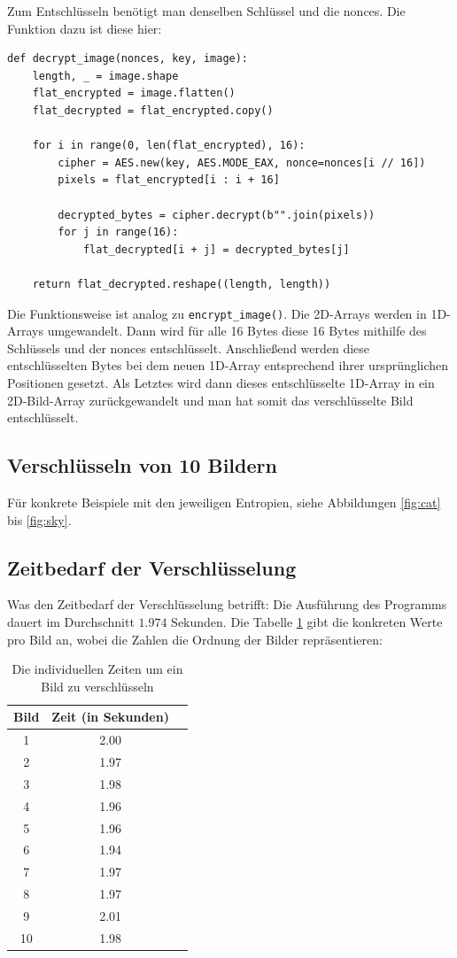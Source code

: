 Zum Entschlüsseln benötigt man denselben Schlüssel und die nonces. Die Funktion dazu ist diese hier:
\begin{lstlisting}
def decrypt_image(nonces, key, image):
    length, _ = image.shape
    flat_encrypted = image.flatten()
    flat_decrypted = flat_encrypted.copy()

    for i in range(0, len(flat_encrypted), 16):
        cipher = AES.new(key, AES.MODE_EAX, nonce=nonces[i // 16])
        pixels = flat_encrypted[i : i + 16]

        decrypted_bytes = cipher.decrypt(b"".join(pixels))
        for j in range(16):
            flat_decrypted[i + j] = decrypted_bytes[j]

    return flat_decrypted.reshape((length, length))
\end{lstlisting}
Die Funktionsweise ist analog zu \lstinline{encrypt_image()}. Die 2D-Arrays werden in 1D-Arrays umgewandelt. Dann wird für alle
16 Bytes diese 16 Bytes mithilfe des Schlüssels und der nonces entschlüsselt. Anschließend werden diese entschlüsselten Bytes
bei dem neuen 1D-Array entsprechend ihrer ursprünglichen Positionen gesetzt. Als Letztes wird dann dieses entschlüsselte 1D-Array
in ein 2D-Bild-Array zurückgewandelt und man hat somit das verschlüsselte Bild entschlüsselt.

\subsection{Verschlüsseln von 10 Bildern}
Für konkrete Beispiele mit den jeweiligen Entropien, siehe Abbildungen \ref{fig:cat} bis \ref{fig:sky}.

\subsection{Zeitbedarf der Verschlüsselung}
Was den Zeitbedarf der Verschlüsselung betrifft: Die Ausführung des Programms dauert im Durchschnitt
$1.974$ Sekunden. Die Tabelle \ref{tab:speed3} gibt die konkreten Werte pro Bild an, wobei die Zahlen
die Ordnung der Bilder repräsentieren:
\begin{table}
	\begin{center}
		\begin{tabular}{ |c|c|c| } 
		\hline
		Bild & Zeit (in Sekunden) \\
		\hline
		1 & 2.00 \\
		2 & 1.97\\
		3 & 1.98\\
		4 & 1.96\\
		5 & 1.96\\
		6 & 1.94\\
		7 & 1.97\\
		8 & 1.97\\
		9 & 2.01\\
		10 & 1.98\\
		\hline
		\end{tabular}
	\end{center}
	\caption{Die individuellen Zeiten um ein Bild zu verschlüsseln}
	\label{tab:speed3}
\end{table}

